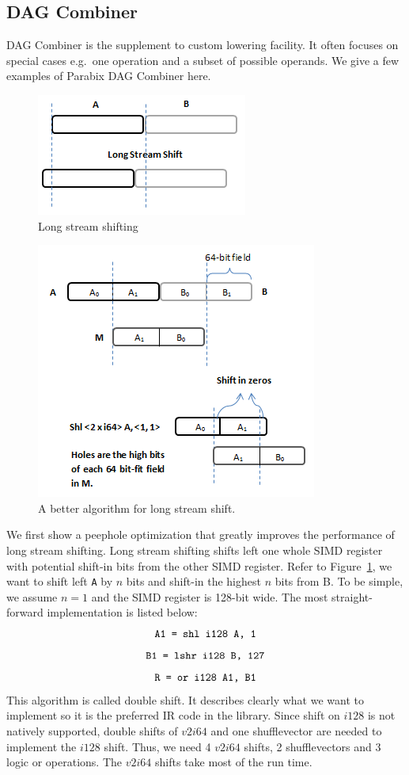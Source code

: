 \subsection{DAG Combiner}
DAG Combiner is the supplement to custom lowering facility. It often focuses on special cases e.g.\ one operation and a subset of possible operands. We give a few examples of Parabix DAG Combiner here.

\begin{figure}[htbp!]
\centering
\includegraphics[scale=0.8]{draw/long_shift.png}
\caption{Long stream shifting}
\label{fig:long_shift}
\end{figure}

\begin{figure}[htbp!]
\centering
\includegraphics[scale=0.9]{draw/long_shift_good.png}
\caption{A better algorithm for long stream shift.}
\label{fig:long_shift_good}
\end{figure}

We first show a peephole optimization that greatly improves the performance of long stream shifting. Long stream shifting shifts left one whole SIMD register with potential shift-in bits from the other SIMD register. Refer to Figure~\ref{fig:long_shift}, we want to shift left {\tt A} by $n$ bits and shift-in the highest $n$ bits from B. To be simple, we assume $n = 1$ and the SIMD register is 128-bit wide. The most straight-forward implementation is listed below:
  \[ \text{\tt A1 = shl i128 A, 1} \]
  \[ \text{\tt B1 = lshr i128 B, 127} \]
  \[ \text{\tt R = or i128 A1, B1} \]
This algorithm is called double shift. It describes clearly what we want to implement so it is the preferred IR code in the library. Since shift on $i128$ is not natively supported, double shifts of $v2i64$ and one shufflevector are needed to implement the $i128$ shift. Thus, we need 4 $v2i64$ shifts, 2 shufflevectors and 3 logic or operations. The $v2i64$ shifts take most of the run time.

